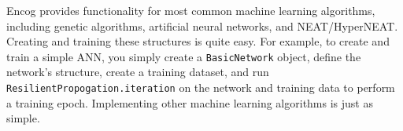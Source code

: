 Encog provides functionality for most common machine learning algorithms, including genetic algorithms, artificial neural networks, and NEAT/HyperNEAT.  Creating and training these structures is quite easy.  For example, to create and train a simple ANN, you simply create a \texttt{BasicNetwork} object, define the network's structure, create a training dataset, and run \texttt{ResilientPropogation.iteration} on the network and training data to perform a training epoch.  Implementing other machine learning algorithms is just as simple.